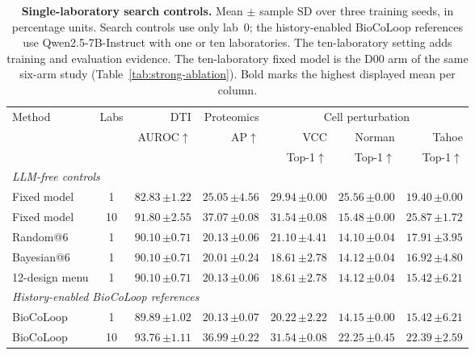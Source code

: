 \begin{table}[!ht]
\centering
\caption{\textbf{Single-laboratory search controls.} Mean $\pm$ sample SD over three training seeds, in percentage units. Search controls use only lab~0; the history-enabled BioCoLoop references use Qwen2.5-7B-Instruct with one or ten laboratories. The ten-laboratory setting adds training and evaluation evidence. The ten-laboratory fixed model is the D00 arm of the same six-arm study (Table~\ref{tab:strong-ablation}). Bold marks the highest displayed mean per column.}
\label{tab:single-lab-search}
\small
\setlength{\tabcolsep}{3pt}
\renewcommand{\arraystretch}{1.13}
\begin{tabular*}{\textwidth}{@{\extracolsep{\fill}}lcrrrrr@{}}
\toprule
Method & Labs & DTI & Proteomics & \multicolumn{3}{c}{Cell perturbation} \\
\cmidrule(lr){5-7}
 & & AUROC$\uparrow$ & AP$\uparrow$ & VCC & Norman & Tahoe \\
 & & & & Top-1$\uparrow$ & Top-1$\uparrow$ & Top-1$\uparrow$ \\
\midrule
\multicolumn{7}{l}{\emph{LLM-free controls}} \\
Fixed model & 1 & $82.83\,{\scriptstyle\pm1.22}$ & $25.05\,{\scriptstyle\pm4.56}$ & $29.94\,{\scriptstyle\pm0.00}$ & $\mathbf{25.56}\,{\scriptstyle\pm0.00}$ & $19.40\,{\scriptstyle\pm0.00}$ \\
Fixed model & 10 & $91.80\,{\scriptstyle\pm2.55}$ & $\mathbf{37.07}\,{\scriptstyle\pm0.08}$ & $\mathbf{31.54}\,{\scriptstyle\pm0.08}$ & $15.48\,{\scriptstyle\pm0.00}$ & $\mathbf{25.87}\,{\scriptstyle\pm1.72}$ \\
Random@6 & 1 & $90.10\,{\scriptstyle\pm0.71}$ & $20.13\,{\scriptstyle\pm0.06}$ & $21.10\,{\scriptstyle\pm4.41}$ & $14.10\,{\scriptstyle\pm0.04}$ & $17.91\,{\scriptstyle\pm3.95}$ \\
Bayesian@6 & 1 & $90.10\,{\scriptstyle\pm0.71}$ & $20.01\,{\scriptstyle\pm0.24}$ & $18.61\,{\scriptstyle\pm2.78}$ & $14.12\,{\scriptstyle\pm0.04}$ & $16.92\,{\scriptstyle\pm4.80}$ \\
12-design menu & 1 & $90.10\,{\scriptstyle\pm0.71}$ & $20.13\,{\scriptstyle\pm0.06}$ & $18.61\,{\scriptstyle\pm2.78}$ & $14.12\,{\scriptstyle\pm0.04}$ & $15.42\,{\scriptstyle\pm6.21}$ \\
\midrule
\multicolumn{7}{l}{\emph{History-enabled BioCoLoop references}} \\
BioCoLoop & 1 & $89.89\,{\scriptstyle\pm1.02}$ & $20.13\,{\scriptstyle\pm0.07}$ & $20.22\,{\scriptstyle\pm2.22}$ & $14.15\,{\scriptstyle\pm0.00}$ & $15.42\,{\scriptstyle\pm6.21}$ \\
BioCoLoop & 10 & $\mathbf{93.76}\,{\scriptstyle\pm1.11}$ & $36.99\,{\scriptstyle\pm0.22}$ & $\mathbf{31.54}\,{\scriptstyle\pm0.08}$ & $22.25\,{\scriptstyle\pm0.45}$ & $22.39\,{\scriptstyle\pm2.59}$ \\
\bottomrule
\end{tabular*}
\end{table}
